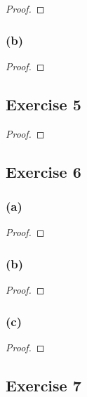 \documentclass[14pt]{extarticle}
\begin{document}
\begin{proof}

\end{proof}

\subsubsection{(b)}

\begin{proof}

\end{proof}

\subsection{Exercise 5}

\begin{proof}

\end{proof}

\subsection{Exercise 6}

\subsubsection{(a)}

\begin{proof}

\end{proof}

\subsubsection{(b)}

\begin{proof}

\end{proof}

\subsubsection{(c)}

\begin{proof}

\end{proof}

\subsection{Exercise 7}
\end{document}
